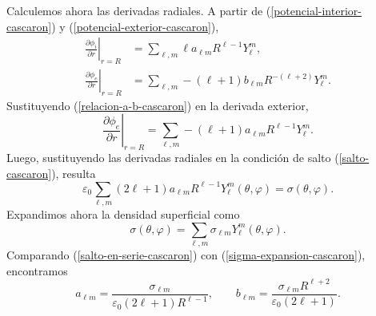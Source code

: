 \documentclass[11pt]{article}
\begin{document}
Calculemos ahora las derivadas radiales. A partir de (\ref{potencial-interior-cascaron}) y (\ref{potencial-exterior-cascaron}),
\begin{align*}
\left.\frac{\partial\phi_i}{\partial r}\right|_{r=R}
&=\sum_{\ell,m}\ell a_{\ell m}R^{\ell-1}Y_\ell^m,\\
\left.\frac{\partial\phi_e}{\partial r}\right|_{r=R}
&=\sum_{\ell,m}-(\ell+1)b_{\ell m}R^{-(\ell+2)}Y_\ell^m.
\end{align*}
Sustituyendo (\ref{relacion-a-b-cascaron}) en la derivada exterior,
\begin{equation*}
\left.\frac{\partial\phi_e}{\partial r}\right|_{r=R}
=\sum_{\ell,m}-(\ell+1)a_{\ell m}R^{\ell-1}Y_\ell^m.
\end{equation*}
Luego, sustituyendo las derivadas radiales en la condición de salto (\ref{salto-cascaron}), resulta
\begin{equation}
\label{salto-en-serie-cascaron}
\varepsilon_0\sum_{\ell,m}(2\ell+1)a_{\ell m}R^{\ell-1}Y_\ell^m(\theta,\varphi)=\sigma(\theta,\varphi).
\end{equation}
Expandimos ahora la densidad superficial como
\begin{equation}
\label{sigma-expansion-cascaron}
\sigma(\theta,\varphi)=\sum_{\ell,m}\sigma_{\ell m}Y_\ell^m(\theta,\varphi).
\end{equation}
Comparando (\ref{salto-en-serie-cascaron}) con (\ref{sigma-expansion-cascaron}), encontramos
\begin{equation}
\label{coeficientes-generales-cascaron}
a_{\ell m}=\frac{\sigma_{\ell m}}{\varepsilon_0(2\ell+1)R^{\ell-1}},
\qquad
b_{\ell m}=\frac{\sigma_{\ell m}R^{\ell+2}}{\varepsilon_0(2\ell+1)}.
\end{equation}
\end{document}

